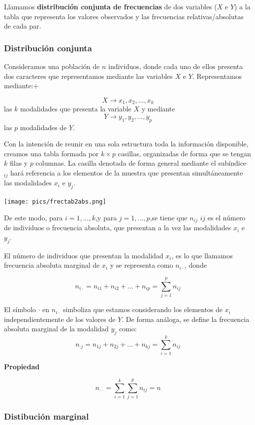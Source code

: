 \documentclass[]{article}
\numberwithin{equation}{section}
\begin{document}
Llamamos \textbf{distribución conjunta de frecuencias} de dos variables
(\(X\) e \(Y\)) a la tabla que representa los valores observados y las
frecuencias relativas/absolutas de cada par.

\subsubsection{Distribución conjunta}\label{distribucion-conjunta}

Consideramos una población de \(n\) individuos, donde cada uno de ellos
presenta dos caracteres que representamos mediante las variables \(X\) e
\(Y\). Representamos mediante:+

\[
X \rightarrow x_1,x_2,...,x_k
\] las \(k\) modalidades que presenta la variable \(X\) y mediante \[
Y \rightarrow y_1,y_2,...,y_p
\] las \(p\) modalidades de \(Y\).

Con la intención de reunir en una sola estructura toda la información
disponible, creamos una tabla formada por \(k\times p\) casillas,
organizadas de forma que se tengan \(k\) filas y \(p\) columnas. La
casilla denotada de forma general mediante el subíndice \(_{ij}\) hará
referencia a los elementos de la muestra que presentan simultáneamente
las modalidades \(x_i\) e \(y_j\).

\texttt{[image: pics/frectab2abs.png]}

De este modo, para \(i=1,...,k\),y para \(j=1,...,p\),se tiene que
\(n_{ij}\) \(ij\) es el número de individuos o frecuencia absoluta, que
presentan a la vez las modalidades \(x_i\) e \(y_j\).

El número de individuos que presentan la modalidad \(x_i\), es lo que
llamamos frecuencia absoluta marginal de \(x_i\) y se representa como
\(n_{i\cdot}\), donde

\[
    n_{i\cdot} = n_{i1}+n_{i2} + ... + n_{ip} = \sum_{j=1}^{p} n_{ij}
\]

El símbolo \(\cdot\) en \(n_{i\cdot}\) simboliza que estamos
considerando los elementos de \(x_i\) independientemente de los valores
de \(Y\). De forma análoga, se define la frecuencia absoluta marginal de
la modalidad \(y_j\) como: \[
    n_{\cdot j} = n_{1j}+n_{2j} + ... + n_{kj} = \sum_{i=1}^{k} n_{ij}
\]

\textbf{Propiedad}

\[
    n_{\cdot\cdot} = \sum_{i=1}^{k}\sum_{j=1}^{p} n_{ij}  = n
\]

\subsubsection{Distibución marginal}\label{distibucion-marginal}
\end{document}
